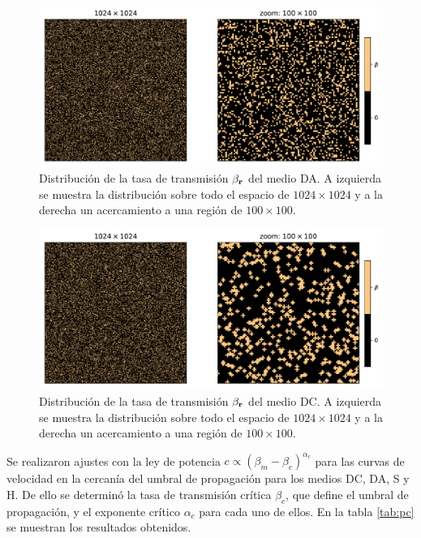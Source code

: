 \begin{figure}[t]
    \centering
    \includegraphics[width=\imsize]{beta_al_zoom.pdf}
    \caption[Medio DA en diferentes escalas]{Distribución de la tasa de transmisión $\beta_{\vb r}$ del medio DA. A izquierda se muestra la distribución sobre 
    todo el espacio de $1024\times1024$ y a la derecha un acercamiento a una región de $100\times100$.}
    \label{beta_al_zoom}
\end{figure}
\begin{figure}[t]
    \centering
    \includegraphics[width=\imsize]{beta_dic_zoom.pdf}
    \caption[Medio DC en diferentes escalas]{Distribución de la tasa de transmisión $\beta_{\vb r}$ del medio DC. A izquierda se muestra la distribución sobre 
    todo el espacio de $1024\times1024$ y a la derecha un acercamiento a una región de $100\times100$.}
    \label{beta_dic_zoom}
\end{figure}

Se realizaron ajustes con la ley de potencia $c\propto(\beta_m-\beta_c)^{\alpha_c}$ para las curvas de velocidad en la cercanía del umbral de propagación para los medios DC, DA, S y H. De ello se determinó la tasa de transmisión crítica $\beta_c$, que define el umbral de propagación, y el exponente crítico $\alpha_c$ para cada uno de ellos. En la tabla \ref{tab:pc} se muestran los resultados obtenidos.


